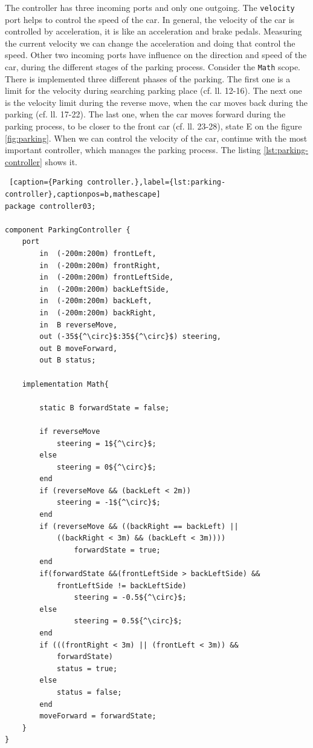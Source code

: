 \bigskip
The controller has three incoming ports and only one outgoing. The \texttt{velocity} port helps to control the speed of the car. In general, the velocity of the car is controlled by acceleration, it is like an acceleration and brake pedals. Measuring the current velocity we can change the acceleration and doing that control the speed. Other two incoming ports have influence on the direction and speed of the car, during the different stages of the parking process. Consider the \texttt{Math} scope. There is implemented three different phases of the parking. The first one is a limit for the velocity during searching parking place (cf. ll. 12-16). The next one is the velocity limit during the reverse move, when the car moves back during the parking (cf. ll. 17-22). The last one, when the car moves forward during the parking process, to be closer to the front car (cf. ll. 23-28), state E on the figure \ref{fig:parking}. When we can control the velocity of the car, continue with the most important controller, which manages the parking process. The listing \ref{lst:parking-controller} shows it. 
\bigskip
\begin{lstlisting} [caption={Parking controller.},label={lst:parking-controller},captionpos=b,mathescape]
package controller03;

component ParkingController {
    port
        in  (-200m:200m) frontLeft,
        in  (-200m:200m) frontRight,
        in  (-200m:200m) frontLeftSide,
        in  (-200m:200m) backLeftSide,
        in  (-200m:200m) backLeft,
        in  (-200m:200m) backRight,
        in  B reverseMove,
        out (-35${^\circ}$:35${^\circ}$) steering,
        out B moveForward,
        out B status;

    implementation Math{
        
        static B forwardState = false;
        
        if reverseMove
            steering = 1${^\circ}$;
        else
            steering = 0${^\circ}$;
        end
        if (reverseMove && (backLeft < 2m))
            steering = -1${^\circ}$;
        end
        if (reverseMove && ((backRight == backLeft) ||
            ((backRight < 3m) && (backLeft < 3m))))
                forwardState = true;
        end
        if(forwardState &&(frontLeftSide > backLeftSide) &&
            frontLeftSide != backLeftSide)
                steering = -0.5${^\circ}$;
        else
                steering = 0.5${^\circ}$;
        end
        if (((frontRight < 3m) || (frontLeft < 3m)) &&
            forwardState)
            status = true;
        else
            status = false; 
        end
        moveForward = forwardState;
    }
}
\end{lstlisting}
